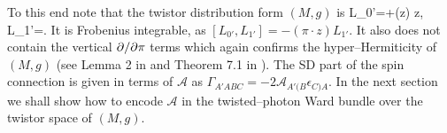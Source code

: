 To this end note that the twistor distribution form $(M,  g)$ is
\be
\label{tdistribution}
L_{0'}=\pi\cdot{}+(z\cdot\pi) z\cdot{}, \quad
L_{1'}=\pi\cdot{}.
\ee
It is Frobenius integrable, as $[L_{0'}, L_{1'}]=-(\pi\cdot z)L_{1'}$. It also does not contain the vertical $\partial/\partial \pi$ terms which again confirms the hyper--Hermiticity
of $(M, g)$ (see Lemma 2 in \cite{D99} and Theorem  7.1 in \cite{Cal2}). The SD part of the
spin connection is given in terms of ${\mathcal A}$ as
$\Gamma_{A'ABC}=-2{\mathcal A}_{A'(B}\epsilon_{C)A}$.
\koniec
In the next section we shall show how to encode
${\mathcal A}$ in the twisted--photon Ward bundle over the twistor space
of $(M, g)$.
